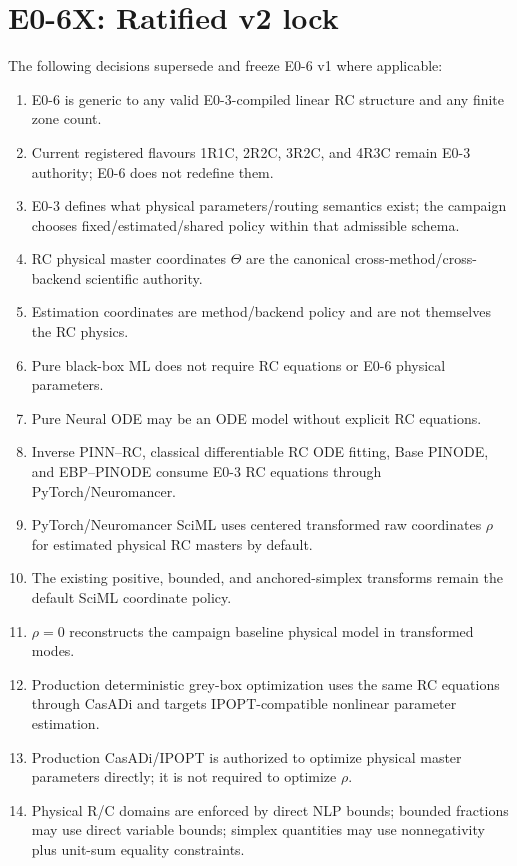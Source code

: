 \documentclass[11pt]{article}
\begin{document}
\section{E0-6X: Ratified v2 lock}

The following decisions supersede and freeze E0-6 v1 where applicable:
\begin{enumerate}[leftmargin=*]
\item E0-6 is generic to any valid E0-3-compiled linear RC structure and any finite zone count.
\item Current registered flavours 1R1C, 2R2C, 3R2C, and 4R3C remain E0-3 authority; E0-6 does not redefine them.
\item E0-3 defines what physical parameters/routing semantics exist; the campaign chooses fixed/estimated/shared policy within that admissible schema.
\item RC physical master coordinates $\Theta$ are the canonical cross-method/cross-backend scientific authority.
\item Estimation coordinates are method/backend policy and are not themselves the RC physics.
\item Pure black-box ML does not require RC equations or E0-6 physical parameters.
\item Pure Neural ODE may be an ODE model without explicit RC equations.
\item Inverse PINN--RC, classical differentiable RC ODE fitting, Base PINODE, and EBP--PINODE consume E0-3 RC equations through PyTorch/Neuromancer.
\item PyTorch/Neuromancer SciML uses centered transformed raw coordinates $\rho$ for estimated physical RC masters by default.
\item The existing positive, bounded, and anchored-simplex transforms remain the default SciML coordinate policy.
\item $\rho=0$ reconstructs the campaign baseline physical model in transformed modes.
\item Production deterministic grey-box optimization uses the same RC equations through CasADi and targets IPOPT-compatible nonlinear parameter estimation.
\item Production CasADi/IPOPT is authorized to optimize physical master parameters directly; it is not required to optimize $\rho$.
\item Physical R/C domains are enforced by direct NLP bounds; bounded fractions may use direct variable bounds; simplex quantities may use nonnegativity plus unit-sum equality constraints.

\end{enumerate}
\end{document}
